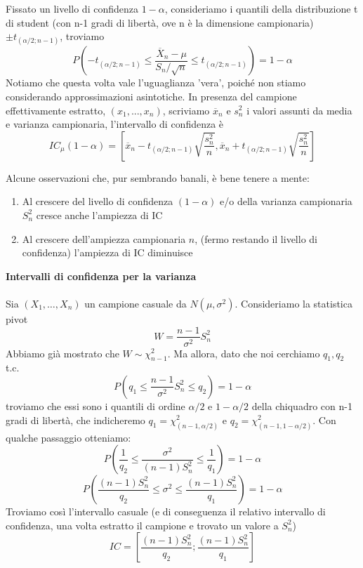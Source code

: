 Fissato un livello di confidenza $1-\alpha$, consideriamo i quantili della distribuzione t di student (con n-1 gradi di libertà, ove n è la dimensione campionaria) 
$\pm t_{(\alpha/2;n-1)}$, 
troviamo $$ P\left(-t_{(\alpha/2;n-1)} \leq \frac{\overline{X}_n - \mu}{S_n / \sqrt{n}}
 \leq t_{(\alpha/2;n-1)}\right) = 1 - \alpha $$
Notiamo che questa volta vale l'uguaglianza 'vera', poiché non stiamo considerando approssimazioni asintotiche. 
In presenza del campione effettivamente estratto, $(x_1,...,x_n)$, 
scriviamo $\overline{x}_n$ e $s^2_n$ i valori assunti da media e varianza campionaria,
l'intervallo di confidenza è $$IC_{\mu}(1-\alpha)=
\left[\overline{x}_n -
 t_{(\alpha / 2;n-1)} 
 \sqrt{\frac{s^2_n}{n}},
  \overline{x}_n + t_{(\alpha / 2;n-1)}\sqrt{\frac{s^2_n}{n}}\right]$$
\begin{oss}
Alcune osservazioni che, pur sembrando banali, è bene tenere a mente:
\begin{enumerate}
\item Al crescere del livello di confidenza $(1-\alpha)$ e/o della varianza campionaria $S^2_n$ cresce anche l'ampiezza di IC
\item Al crescere dell'ampiezza campionaria $n$, (fermo restando il livello di confidenza) l'ampiezza di IC diminuisce
\end{enumerate}
\end{oss}

\noindent\textbf{Intervalli di confidenza per la varianza}
\\ \\
Sia \((X_1,\dotsc,X_n)\) un campione casuale da $N(\mu,\sigma^2)$.
Consideriamo la statistica pivot $$W=\frac{n-1}{\sigma^2} S^2_n$$ Abbiamo già mostrato che $W \sim \chi^2_{n-1}$. 
Ma allora, dato che noi cerchiamo $q_1,q_2$ t.c. 
$$P \left( q_1 \leq \frac{n-1}{\sigma^2} S^2_n \leq q_2 \right) =1-\alpha$$ 
troviamo che essi sono i quantili di ordine $\alpha / 2$ e $1 - \alpha / 2$ della chiquadro con n-1 gradi di libertà, che indicheremo $q_1=\chi^2_{(n-1,\alpha / 2)}$ e $q_2=\chi^2_{(n-1,1 - \alpha / 2)}$.
Con qualche passaggio otteniamo:
$$P \left( \frac{1}{q_2} \leq \frac{\sigma^2}{(n-1) S^2_n} \leq \frac{1}{q_1} \right) =1-\alpha$$
$$P \left( \frac{(n-1) S^2_n}{q_2} \leq \sigma^2 \leq \frac{(n-1) S^2_n}{q_1} \right) =1-\alpha$$
Troviamo così l'intervallo casuale (e di conseguenza il relativo intervallo di confidenza, una volta estratto il campione e trovato un valore a $S^2_n$) $$IC=\left[ \frac{(n-1)S^2_n}{q_2};\frac{(n-1)S^2_n}{q_1} \right]$$
\\ \\
